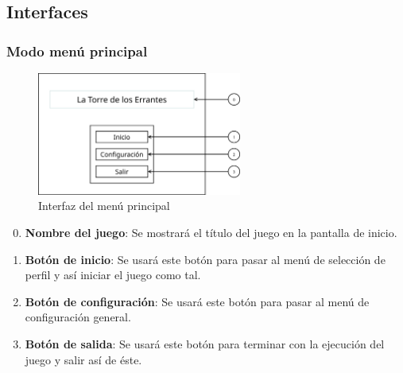 \subsection{Interfaces} %



\subsubsection{Modo menú principal}
\begin{figure}[H]
    \centering
    \includegraphics[width=0.6\textwidth]{5-Cuerpo/Chapter5/I1.png} %
    \caption{Interfaz del menú principal}
    \label{fig:Interface_Menu_Principal}
\end{figure}
\begin{enumerate}\setcounter{enumi}{-1}
    \item \textbf{Nombre del juego}: Se mostrará el título del juego en la
    pantalla de inicio.
    \item \textbf{Botón de inicio}: Se usará este botón para pasar al menú de
    selección de perfil y así iniciar el juego como tal.
    \item \textbf{Botón de configuración}: Se usará este botón para pasar al
    menú de configuración general.
    \item \textbf{Botón de salida}: Se usará este botón para terminar con la
    ejecución del juego y salir así de éste.
\end{enumerate}

